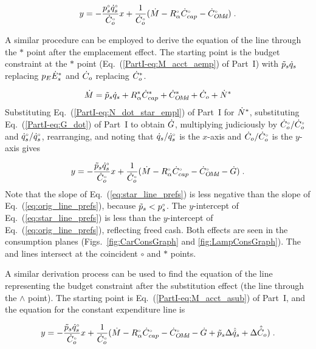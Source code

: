 \begin{equation} \label{eq:orig_line_prefs}
  y = - \frac{{}{p}^{\scriptscriptstyle \circ}_s {}{\dot{q}}^{\scriptscriptstyle \circ}_s}{{}{\dot{C}}^{\scriptscriptstyle \circ}_o} x
         + \frac{1}{{}{\dot{C}}^{\scriptscriptstyle \circ}_o} (\dot{M} - {}{R}^{\scriptscriptstyle \circ}_\alpha {}{\dot{C}}^{\scriptscriptstyle \circ}_{cap} - {}{\dot{C}}^{\scriptscriptstyle \circ}_{O\!M\!d}) \; .
\end{equation}

A similar procedure can be employed to derive the equation of the
\starstar{} line through the $*$ point
after the emplacement effect.
The starting point is the budget constraint at the $*$ point
(Eq.~(\ref{PartI-eq:M_acct_aemp}) of Part~I)
with 
$\tilde{p}_s \dot{q}_s$ replacing $p_E {\dot{E}}^*_s$ and
$\dot{C}_o$ replacing ${\dot{C}}^*_o$.

\begin{equation}
  \dot{M} = \tilde{p}_s \dot{q}_s + {R}^*_\alpha {\dot{C}}^*_{cap} + {\dot{C}}^*_{O\!M\!d} + \dot{C}_o + {\dot{N}}^*
\end{equation}
%
Substituting Eq.~(\ref{PartI-eq:N_dot_star_empl}) of Part~I for ${\dot{N}}^*$,
substituting Eq.~(\ref{PartI-eq:G_dot}) of Part~I to obtain $\dot{G}$,
multiplying judiciously by ${}{\dot{C}}^{\scriptscriptstyle \circ}_o/{}{\dot{C}}^{\scriptscriptstyle \circ}_o$ and ${}{\dot{q}}^{\scriptscriptstyle \circ}_s/{}{\dot{q}}^{\scriptscriptstyle \circ}_s$, 
rearranging, and noting that 
$\dot{q}_s/{}{\dot{q}}^{\scriptscriptstyle \circ}_s$ is the $x$-axis and 
$\dot{C}_o/{}{\dot{C}}^{\scriptscriptstyle \circ}_o$ is the $y$-axis gives

\begin{equation} \label{eq:star_line_prefs}
  y = - \frac{\tilde{p}_s {}{\dot{q}}^{\scriptscriptstyle \circ}_s}{{}{\dot{C}}^{\scriptscriptstyle \circ}_o} x
         + \frac{1}{{}{\dot{C}}^{\scriptscriptstyle \circ}_o} (\dot{M} - {}{R}^{\scriptscriptstyle \circ}_\alpha {}{\dot{C}}^{\scriptscriptstyle \circ}_{cap} - {}{\dot{C}}^{\scriptscriptstyle \circ}_{O\!M\!d} - \dot{G}) \; .
\end{equation}
%
Note that the slope of Eq.~(\ref{eq:star_line_prefs}) is less negative
than the slope of Eq.~(\ref{eq:orig_line_prefs}), 
because $\tilde{p}_s < {}{p}^{\scriptscriptstyle \circ}_s$.
The $y$-intercept of Eq.~(\ref{eq:star_line_prefs}) is less than the 
$y$-intercept of Eq.~(\ref{eq:orig_line_prefs}),
reflecting freed cash.
Both effects are seen in
the consumption planes
(Figs.~\ref{fig:CarConsGraph} and \ref{fig:LampConsGraph}).
The \circcirc{} and \starstar{} lines intersect at the coincident $\circ$ and $*$ points.

A similar derivation process can be used to find the equation of 
the line representing the budget constraint
after the substitution effect (the \hathat{} line through the $\wedge$ point).
The starting point is Eq.~(\ref{PartI-eq:M_acct_asub}) of Part~I, and 
the equation for the constant expenditure line is

\begin{equation} \label{eq:hat_line_prefs}
  y = - \frac{\tilde{p}_s {}{\dot{q}}^{\scriptscriptstyle \circ}_s}{{}{\dot{C}}^{\scriptscriptstyle \circ}_o} x
         + \frac{1}{{}{\dot{C}}^{\scriptscriptstyle \circ}_o} (\dot{M} - {}{R}^{\scriptscriptstyle \circ}_\alpha {}{\dot{C}}^{\scriptscriptstyle \circ}_{cap} - {}{\dot{C}}^{\scriptscriptstyle \circ}_{O\!M\!d} 
                                   - \dot{G} + \tilde{p}_s \Delta \hat{\dot{q}}_s + \Delta \hat{\dot{C}}_o) \; .
\end{equation}


